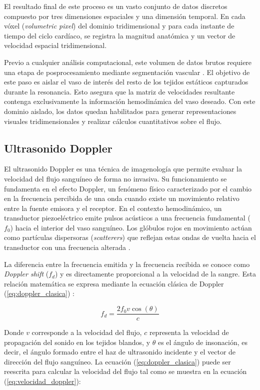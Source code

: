 El resultado final de este proceso es un vasto conjunto de datos discretos compuesto por tres dimensiones espaciales y una dimensión temporal. En cada vóxel (\textit{volumetric pixel}) del dominio tridimensional y para cada instante de tiempo del ciclo cardíaco, se registra la magnitud anatómica y un vector de velocidad espacial tridimensional.

Previo a cualquier análisis computacional, este volumen de datos brutos requiere una etapa de posprocesamiento mediante segmentación vascular \cite{Soulat2020}. El objetivo de este paso es aislar el vaso de interés del resto de los tejidos estáticos capturados durante la resonancia. Esto asegura que la matriz de velocidades resultante contenga exclusivamente la información hemodinámica del vaso deseado. Con este dominio aislado, los datos quedan habilitados para generar representaciones visuales tridimensionales y realizar cálculos cuantitativos sobre el flujo.

\subsection{Ultrasonido Doppler}\label{subsection:doppler_ultrasound}

El ultrasonido Doppler es una técnica de imagenología que permite evaluar la velocidad del flujo sanguíneo de forma no invasiva. Su funcionamiento se fundamenta en el efecto Doppler, un fenómeno físico caracterizado por el cambio en la frecuencia percibida de una onda cuando existe un movimiento relativo entre la fuente emisora y el receptor. En el contexto hemodinámico, un transductor piezoeléctrico emite pulsos acústicos a una frecuencia fundamental ($f_0$) hacia el interior del vaso sanguíneo. Los glóbulos rojos en movimiento actúan como partículas dispersoras (\textit{scatterers}) que reflejan estas ondas de vuelta hacia el transductor con una frecuencia alterada \cite{Poggi2024}.

La diferencia entre la frecuencia emitida y la frecuencia recibida se conoce como \textit{Doppler shift} ($f_d$) y es directamente proporcional a la velocidad de la sangre. Esta relación matemática se expresa mediante la ecuación clásica de Doppler (\ref{eq:doppler_clasica}) \cite{GOFFI2025217}:

\begin{equation}
    f_d = \frac{2 f_0 v \cos(\theta)}{c}
    \label{eq:doppler_clasica}
\end{equation}

Donde $v$ corresponde a la velocidad del flujo, $c$ representa la velocidad de propagación del sonido en los tejidos blandos, y $\theta$ es el ángulo de insonación, es decir, el ángulo formado entre el haz de ultrasonido incidente y el vector de dirección del flujo sanguíneo. La ecuación (\ref{eq:doppler_clasica}) puede ser reescrita para calcular la velocidad del flujo tal como se muestra en la ecuación (\ref{eq:velocidad_doppler}):

